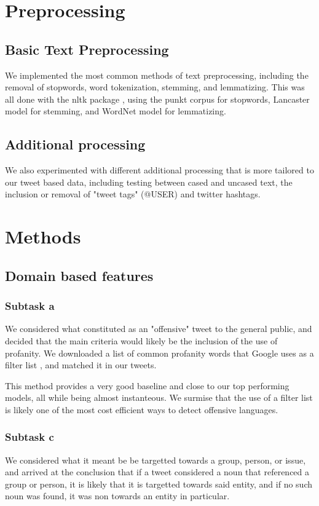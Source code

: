 \documentclass[a4paper, 12pt]{article}
\begin{document}
        \newpage
    \begin{multicols}{2}

    \section{Preprocessing}
        \subsection{Basic Text Preprocessing}
            We implemented the most common methods of text preprocessing, including the removal of stopwords, word tokenization, stemming, and lemmatizing. This was all done with the nltk package \cite{NLTK}, using the punkt corpus for stopwords, Lancaster model for stemming, and WordNet model for lemmatizing.
        \subsection{Additional processing}
            We also experimented with different additional processing that is more tailored to our tweet based data, including testing between cased and uncased text, the inclusion or removal of "tweet tags" (@USER) and twitter hashtags.

    \section{Methods}
        \subsection{Domain based features}
            \subsubsection{Subtask a}
                We considered what constituted as an "offensive" tweet to the general public, and decided that the main criteria would likely be the inclusion of the use of profanity. We downloaded a list of common profanity words that Google uses as a filter list \cite{profane}, and matched it in our tweets. 

                This method provides a very good baseline and close to our top performing models, all while being almost instanteous. We surmise that the use of a filter list is likely one of the most cost efficient ways to detect offensive languages.
            \subsubsection{Subtask c}
                We considered what it meant be be targetted towards a group, person, or issue, and arrived at the conclusion that if a tweet considered a noun that referenced a group or person, it is likely that it is targetted towards said entity, and if no such noun was found, it was non towards an entity in particular. 


\end{multicols}
\end{document}
